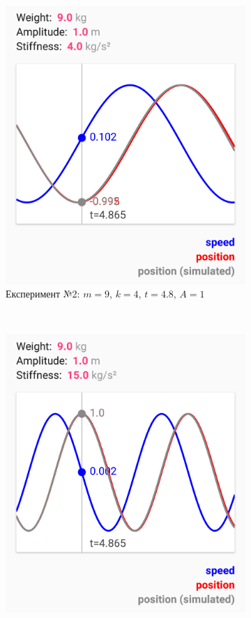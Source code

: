 \begin{figure}[H]
\begin{subfigure}[t]{0.45\linewidth}
    	\includegraphics[width=1\linewidth]{experiment2}
    	\caption{Експеримент №2: $m = 9$, $k = 4$, $t = 4.8$, $A = 1$}
    \end{subfigure}
    ~
    \begin{subfigure}[t]{0.45\linewidth}
    	\includegraphics[width=1\linewidth]{experiment3}

\end{subfigure}
\end{figure}
